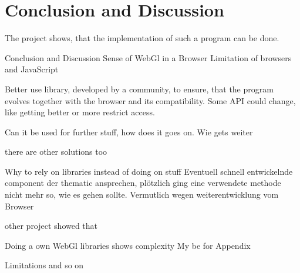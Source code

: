 \chapter{Conclusion and Discussion }


The project shows, that the implementation of such a program can be done.



Conclusion and Discussion 
Sense of WebGl in a Browser
Limitation of browsers and JavaScript




Better use library, developed by a community, to ensure, that the program evolves together with the browser and its compatibility. Some API could change, like getting better or more restrict access.

Can it be used for further stuff, how does it goes on. Wie gets weiter


there are other solutions too


Why to rely on libraries instead of doing on stuff
Eventuell schnell entwickelnde component der thematic ansprechen, plötzlich ging eine verwendete methode nicht mehr so, wie es gehen sollte. Vermutlich wegen weiterentwicklung vom Browser

other project showed that





Doing a own WebGl libraries shows complexity
My be for Appendix


Limitations and so on
